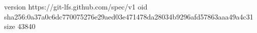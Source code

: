 version https://git-lfs.github.com/spec/v1
oid sha256:0a37a0c6dc770075276e29aed03e471478da28034b9296afd57863aaa49a4c31
size 43840
